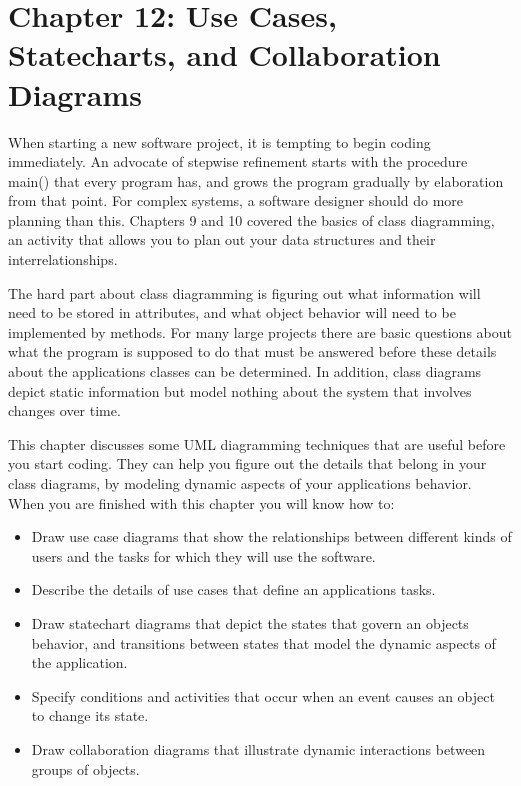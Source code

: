 \clearpage\section{Chapter 12: Use Cases, Statecharts, and Collaboration
Diagrams}
When starting a new software project, it is tempting to begin coding
immediately. An advocate of stepwise refinement starts with the
procedure \textsf{main()} that every program has, and grows the program
gradually by elaboration from that point. For complex systems, a
software designer should do more planning than this. Chapters 9 and 10
covered the basics of class diagramming, an activity that allows you to
plan out your data structures and their interrelationships.

The hard part about class diagramming is figuring out what information
will need to be stored in attributes, and what object behavior will
need to be implemented by methods. For many large projects there are
basic questions about what the program is supposed to do that must be
answered before these details about the application{\textquotesingle}s
classes can be determined. In addition, class diagrams depict static
information but model nothing about the system that involves changes
over time.

This chapter discusses some UML diagramming techniques that are useful
before you start coding. They can help you figure out the details that
belong in your class diagrams, by modeling dynamic aspects of your
application{\textquotesingle}s behavior. When you are finished with
this chapter you will know how to:

\begin{itemize}
\item Draw use case diagrams that show the relationships between
different kinds of users and the tasks for which they will use the
software.
\item Describe the details of use cases that define an
application{\textquotesingle}s tasks.
\item Draw statechart diagrams that depict the states that govern an
object{\textquotesingle}s behavior, and transitions between states that
model the dynamic aspects of the application.
\item Specify conditions and activities that occur when an event causes
an object to change its state.
\item Draw collaboration diagrams that illustrate dynamic interactions
between groups of objects.
\end{itemize}
